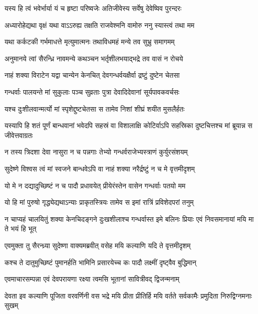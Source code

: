 \twolineshloka
{यस्य हि त्वं भवेर्भार्या यं च हृष्टा परिष्वजेः}
{अतिजीवेस्य सर्वेषु देवेष्विव पुरन्दरः}


\twolineshloka
{अध्यारोहेद्यथा वृक्षं यथा वाऽऽरुह्य तक्षति}
{राजवेश्मनि वामोरु ननु स्यास्त्वं तथा मम}


\twolineshloka
{यथा कर्कटकी गर्भमाधत्ते मृत्युमात्मनः}
{तथाविधमहं मन्ये तव सुभ्रु समागमम्}


\twolineshloka
{अनुमानये त्वां सैरन्ध्रि नावमन्ये कथञ्चन}
{भर्तृशीलभयाद्भद्रे तव वासं न रोचये}




\twolineshloka
{नाहं शक्या विराटेन यद्वा चान्येन केनचित्}
{देवगन्धर्वयक्षैर्वा द्रष्टुं दुष्टेन चेतसा}


\twolineshloka
{गन्धर्वाः पालयन्ते मां सुकुलाः पञ्च सुव्रताः}
{पुत्रा देवादिदेवानां सूर्यपावकवर्चसः}


\twolineshloka
{यश्च दुःशीलवान्मर्त्यो मां स्पृशेद्दुष्टचेतसा}
{स तामेव निशां शीघ्रं शयीत मुसलैर्हतः}


\threelineshloka
{यस्यापि हि शतं पूर्णं बान्धवानां भवेदपि}
{सहस्रं वा विशालाक्षि कोटिर्वाऽपि सहस्रिका}
{दुष्टचित्तश्च मां ब्रूयान्न स जीवेत्तवाग्रतः}


\twolineshloka
{न तस्य त्रिदशा देवा नासुरा न च पन्नगाः}
{तेभ्यो गन्धर्वराजेभ्यस्त्राणं कुर्युरसंशयम्}


\twolineshloka
{सुदेष्णे विश्वस त्वं मां स्वजने बान्धवेऽपि वा}
{नाहं शक्या नरैर्द्रष्टुं न च मे वृत्तमीदृशम्}


\twolineshloka
{यो मे न दद्यादुच्छिष्टं न च पादौ प्रधावयेत्}
{प्रीयेरंस्तेन वासेन गन्धर्वाः पतयो मम}


\twolineshloka
{यो हि मां पुरुषो गृद्ध्येद्यथाऽन्याः प्राकृतस्त्रियः}
{तामेव स इमां रात्रिं प्रविशेदपरां तनुम्}


\threelineshloka
{न चाप्यहं चालयितुं शक्या केनचिदङ्गने}
{दुःखशीलाश्च गन्धर्वास्त इमे बलिनः प्रियाः}
{एवं निवसमानायां मयि मा ते भयं हि भूत्}



\twolineshloka
{एवमुक्ता तु सैरन्ध्र्या सुदेष्णा वाक्यमब्रवीत्}
{वसेह मयि कल्याणि यदि ते वृत्तमीदृशम्}


\twolineshloka
{कश्च ते दातुमुच्छिष्टं पुमानर्हति भामिनि}
{प्रसारयेच्च कः पादौ लक्ष्मीं दृष्ट्वैव बुद्धिमान्}


\twolineshloka
{एवमाचारसम्पन्ना एवं देवपरायणा}
{रक्ष्या त्वमसि भूतानां सावित्रीवद् द्विजन्मनाम्}


\threelineshloka
{देवता इव कल्याणि पूजिता वरवर्णिनी}
{वस भद्रे मयि प्रीता प्रीतिर्हि मयि वर्तते}
{सर्वकामैः प्रमुदिता निरुद्विग्नमनाः सुखम्}


